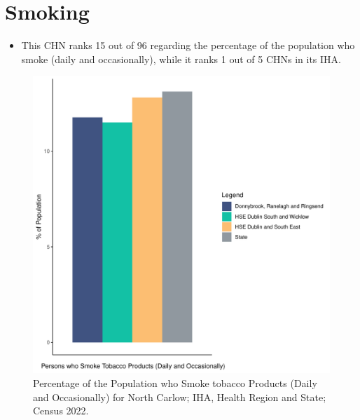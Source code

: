 \documentclass{article}
\begin{document}
\pagebreak

\section{Smoking}\label{sect:Smoking}
\begin{itemize}
\item This CHN ranks  15 out of 96 regarding the percentage of the population who smoke (daily and occasionally), while it ranks   1 out of 5 CHNs in its IHA.
\end{itemize}
\begin{figure}[H]
	\centering
	\includegraphics[width = 120mm]{../figures/SmokingED.pdf}
	\caption{Percentage of the Population who Smoke tobacco Products (Daily and Occasionally) for North Carlow; IHA, Health Region and State; Census 2022.}
	\label{fig:2ae19629-1a6a-13a3-e055-000000000001}
	\end{figure}
	
\end{document}
